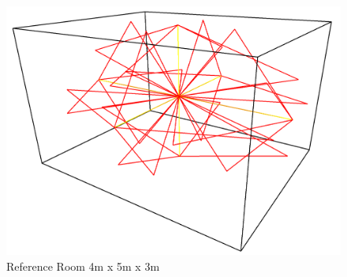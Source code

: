 \begin{figure}[H]
    \begin{center}
    \includegraphics[width=\textwidth]{figures/experiments/reference_room.png}
    \end{center}
    \caption[Reference Room 4m x 5m x 3m]{Reference Room 4m x 5m x 3m}
    \label{fig:referenceRoom}
\end{figure}
